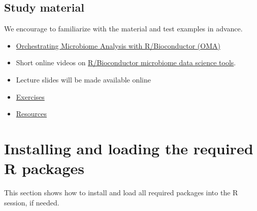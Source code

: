 \documentclass[
]{book}
\begin{document}
\hypertarget{material}{%
\subsection{Study material}\label{material}}

We encourage to familiarize with the material and test examples in advance.

\begin{itemize}
\item
  \href{https://microbiome.github.io/OMA/}{Orchestrating Microbiome Analysis with R/Bioconductor (OMA)}
\item
  Short online videos on \href{https://www.youtube.com/playlist?list=PLjiXAZO27elAJEptP59BN3whVJ61XIkST}{R/Bioconductor microbiome data science tools}.
\item
  Lecture slides will be made available online
\item
  \href{https://microbiome.github.io/OMA/exercises.html}{Exercises}
\item
  \href{https://microbiome.github.io/OMA/resources.html}{Resources}
\end{itemize}

\hypertarget{packages}{%
\section{Installing and loading the required R packages}\label{packages}}

This section shows how to install and load all required packages into
the R session, if needed.
\end{document}

